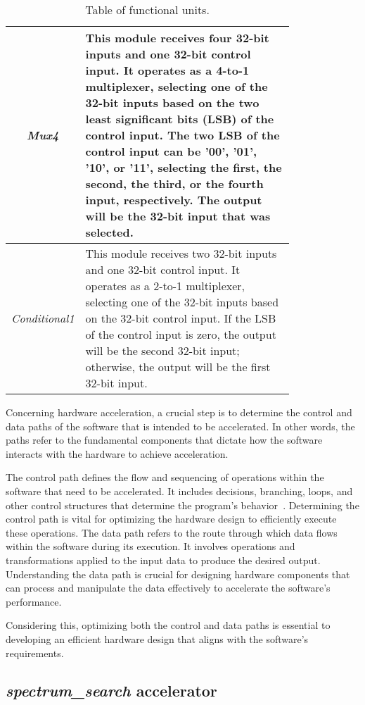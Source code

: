 \begin{table}[H]
\begin{tabular}{|c|p{0.8\linewidth}|}
        \hline
        \multirow{5}{*}{\textit{Mux4}} & This module receives four 32-bit inputs and one 32-bit control input. It operates as a 4-to-1 multiplexer, selecting one of the 32-bit inputs based on the two least significant bits (LSB) of the control input.  The two LSB of the control input can be '00', '01', '10', or '11', selecting the first, the second, the third, or the fourth input, respectively. The output will be the 32-bit input that was selected. \\
        \hline
        \multirow{4}{*}{\textit{Conditional1}} & This module receives two 32-bit inputs and one 32-bit control input. It operates as a 2-to-1 multiplexer, selecting one of the 32-bit inputs based on the 32-bit control input. If the LSB of the control input is zero, the output will be the second 32-bit input; otherwise, the output will be the first 32-bit input. \\
        \hline
    \end{tabular}
    \caption{Table of functional units.}
    \label{tab:fu}
\end{table}

\vspace{0.5cm}

Concerning hardware acceleration, a crucial step is to determine the control and data paths of the software that is intended to be accelerated. In other words, the paths refer to the fundamental components that dictate how the software interacts with the hardware to achieve acceleration.

The control path defines the flow and sequencing of operations within the software that need to be accelerated. It includes decisions, branching, loops, and other control structures that determine the program's behavior~\cite{datacontrolpath}. Determining the control path is vital for optimizing the hardware design to efficiently execute these operations.
The data path refers to the route through which data flows within the software during its execution. It involves operations and transformations applied to the input data to produce the desired output. Understanding the data path is crucial for designing hardware components that can process and manipulate the data effectively to accelerate the software's performance.

Considering this, optimizing both the control and data paths is essential to developing an efficient hardware design that aligns with the software's requirements.

\subsection{\textit{spectrum\_search} accelerator}

